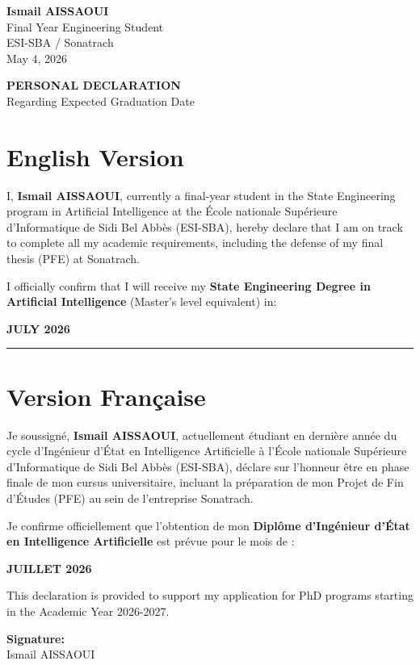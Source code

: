 \documentclass[11pt,a4paper]{article}
\begin{document}
\noindent \textbf{Ismail AISSAOUI} \\
Final Year Engineering Student \\
ESI-SBA / Sonatrach \\
\medskip
May 4, 2026

\bigskip
\bigskip

\begin{center}
    {\Huge \textbf{PERSONAL DECLARATION}} \\
    \medskip
    {\large Regarding Expected Graduation Date}
\end{center}

\bigskip
\bigskip

\section*{English Version}
I, \textbf{Ismail AISSAOUI}, currently a final-year student in the State Engineering program in Artificial Intelligence at the École nationale Supérieure d'Informatique de Sidi Bel Abbès (ESI-SBA), hereby declare that I am on track to complete all my academic requirements, including the defense of my final thesis (PFE) at Sonatrach.

I officially confirm that I will receive my \textbf{State Engineering Degree in Artificial Intelligence} (Master's level equivalent) in:

\begin{center}
    {\Large \textbf{JULY 2026}}
\end{center}

\bigskip
\hrule
\bigskip

\section*{Version Française}
Je soussigné, \textbf{Ismail AISSAOUI}, actuellement étudiant en dernière année du cycle d'Ingénieur d'État en Intelligence Artificielle à l'École nationale Supérieure d'Informatique de Sidi Bel Abbès (ESI-SBA), déclare sur l'honneur être en phase finale de mon cursus universitaire, incluant la préparation de mon Projet de Fin d'Études (PFE) au sein de l'entreprise Sonatrach.

Je confirme officiellement que l'obtention de mon \textbf{Diplôme d'Ingénieur d'État en Intelligence Artificielle} est prévue pour le mois de :

\begin{center}
    {\Large \textbf{JUILLET 2026}}
\end{center}

\bigskip
\bigskip

\noindent This declaration is provided to support my application for PhD programs starting in the Academic Year 2026-2027.

\bigskip
\bigskip

\noindent \textbf{Signature:} \\
\medskip
Ismail AISSAOUI
\end{document}
